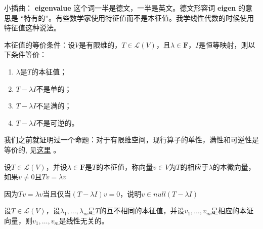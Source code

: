 \documentclass[10pt,a4paper,UTF8]{article}
\begin{document}
小插曲： \textbf{eigenvalue} 这个词一半是德文，一半是英文。德文形容词 \textbf{eigen} 的意思是 “特有的”。有些数学家使用特征值而不是本征值。我学线性代数的时候使用特征值这种说法。

本征值的等价条件：设\(V\)是有限维的，\(T\in \mathcal{L}(V)\)，且\(\lambda\in \mathbf{F}\)，\(I\)是恒等映射，则以下条件等价：
\begin{enumerate}
\item \(\lambda\)是\(T\)的本征值；
\item \(T-\lambda I\)不是单的；
\item \(T-\lambda I\)不是满的；
\item \(T-\lambda I\)不是可逆的。
\end{enumerate}

我们之前就证明过一个命题：对于有限维空间，现行算子的单性，满性和可逆性是等价的, 见\href{invertible-isomorphic.org}{这里} 。

\begin{definition}
设\(T\in \mathcal{L}(V)\)，并设\(\lambda \in \mathbf{F}\)是\(T\)的本征值，称向量\(v\in V\)为\(T\)的相应于\(\lambda\)的本徵向量，如果\(v\neq 0\)且\(Tv = \lambda v\)
\end{definition}

因为\(Tv = \lambda v\)当且仅当\((T - \lambda I)v = 0\)，说明\(v\in null(T-\lambda I)\)

\begin{theorem}
设\(T\in \mathcal{L}(V)\)，设\(\lambda_{1},\ldots ,\lambda_{m}\)是\(T\)的互不相同的本征值，并设\(v_{1},\ldots ,v_{m}\)是相应的本证向量，则\(v_{1},\ldots ,v_{m}\)是线性无关的。
\end{theorem}
\end{document}
